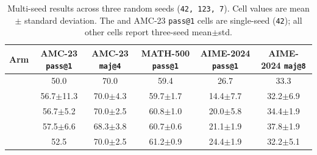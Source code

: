 \begin{table}[t]
\centering\small
\caption{Multi-seed results across three random seeds (\texttt{42, 123, 7}).
Cell values are mean $\pm$ standard deviation. The \base{} and \armD{}
AMC-23 \texttt{pass@1} cells are single-seed (\texttt{42}); all other cells
report three-seed mean$\pm$std.}
\label{tab:main_v2}
\begin{tabular}{lccccc}
\toprule
Arm & AMC-23 \texttt{pass@1} & AMC-23 \texttt{maj@4} & MATH-500 \texttt{pass@1} & AIME-2024 \texttt{pass@1} & AIME-2024 \texttt{maj@8} \\
\midrule
\base{} & 50.0 & 70.0 & 59.4 & 26.7 & 33.3 \\
\armA{} & 56.7$\pm$11.3 & 70.0$\pm$4.3 & 59.7$\pm$1.7 & 14.4$\pm$7.7 & 32.2$\pm$6.9 \\
\armB{} & 56.7$\pm$5.2  & 70.0$\pm$2.5 & 60.8$\pm$1.0 & 20.0$\pm$5.8 & 34.4$\pm$1.9 \\
\armC{} & 57.5$\pm$6.6  & 68.3$\pm$3.8 & 60.7$\pm$0.6 & 21.1$\pm$1.9 & 37.8$\pm$1.9 \\
\armD{} & 52.5          & 70.0$\pm$2.5 & 61.2$\pm$0.9 & 24.4$\pm$1.9 & 32.2$\pm$5.1 \\
\bottomrule
\end{tabular}
\end{table}
